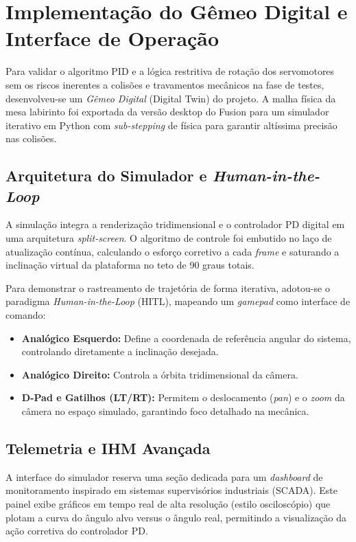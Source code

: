 \documentclass[12pt]{article}
\begin{document}
\section{Implementação do Gêmeo Digital e Interface de Operação}

Para validar o algoritmo PID e a lógica restritiva de rotação dos servomotores sem os riscos inerentes a colisões e travamentos mecânicos na fase de testes, desenvolveu-se um \textit{Gêmeo Digital} (Digital Twin) do projeto. A malha física da mesa labirinto foi exportada da versão desktop do Fusion para um simulador iterativo em Python com \textit{sub-stepping} de física para garantir altíssima precisão nas colisões.

\subsection{Arquitetura do Simulador e \textit{Human-in-the-Loop}}

A simulação integra a renderização tridimensional e o controlador PD digital em uma arquitetura \textit{split-screen}. O algoritmo de controle foi embutido no laço de atualização contínua, calculando o esforço corretivo a cada \textit{frame} e saturando a inclinação virtual da plataforma no teto de 90 graus totais.

Para demonstrar o rastreamento de trajetória de forma iterativa, adotou-se o paradigma \textit{Human-in-the-Loop} (HITL), mapeando um \textit{gamepad} como interface de comando:

\begin{itemize}
    \item \textbf{Analógico Esquerdo:} Define a coordenada de referência angular do sistema, controlando diretamente a inclinação desejada.
    \item \textbf{Analógico Direito:} Controla a órbita tridimensional da câmera.
    \item \textbf{D-Pad e Gatilhos (LT/RT):} Permitem o deslocamento (\textit{pan}) e o \textit{zoom} da câmera no espaço simulado, garantindo foco detalhado na mecânica.
\end{itemize}

\subsection{Telemetria e IHM Avançada}

A interface do simulador reserva uma seção dedicada para um \textit{dashboard} de monitoramento inspirado em sistemas supervisórios industriais (SCADA). Este painel exibe gráficos em tempo real de alta resolução (estilo osciloscópio) que plotam a curva do ângulo alvo versus o ângulo real, permitindo a visualização da ação corretiva do controlador PD.
\end{document}
